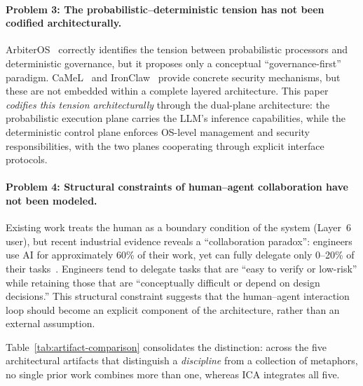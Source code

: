 \paragraph{Problem 3: The probabilistic--deterministic tension has not been codified architecturally.}
ArbiterOS~\cite{arbiteros2025} correctly identifies the tension between probabilistic processors and deterministic governance, but it proposes only a conceptual ``governance-first'' paradigm.
CaMeL~\cite{debenedetti2025camel} and IronClaw~\cite{ironclaw2025} provide concrete security mechanisms, but these are not embedded within a complete layered architecture.
This paper \textit{codifies this tension architecturally} through the dual-plane architecture: the probabilistic execution plane carries the LLM's inference capabilities, while the deterministic control plane enforces OS-level management and security responsibilities, with the two planes cooperating through explicit interface protocols.

\paragraph{Problem 4: Structural constraints of human--agent collaboration have not been modeled.}
Existing work treats the human as a boundary condition of the system (Layer~6 user), but recent industrial evidence reveals a ``collaboration paradox'': engineers use AI for approximately 60\% of their work, yet can fully delegate only 0--20\% of their tasks~\cite{anthropic2026agenticreport}.
Engineers tend to delegate tasks that are ``easy to verify or low-risk'' while retaining those that are ``conceptually difficult or depend on design decisions.''
This structural constraint suggests that the human--agent interaction loop should become an explicit component of the architecture, rather than an external assumption.

Table~\ref{tab:artifact-comparison} consolidates the distinction: across the five architectural artifacts that distinguish a \emph{discipline} from a collection of metaphors, no single prior work combines more than one, whereas ICA integrates all five.

